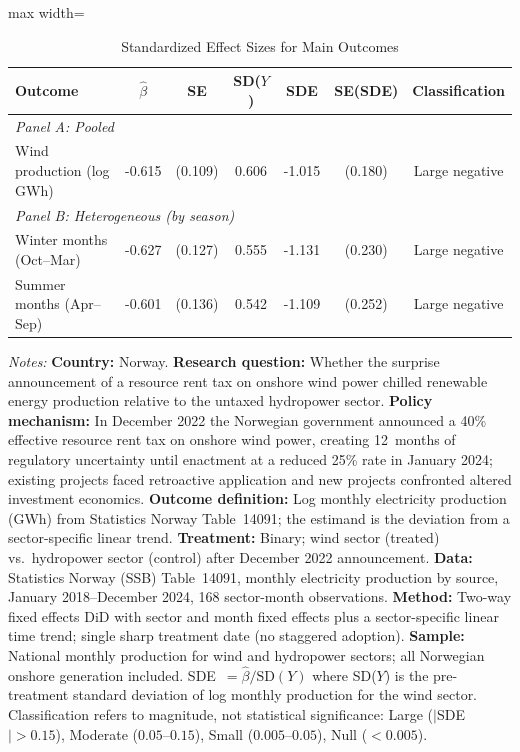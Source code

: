 \begin{table}[H]
\centering
\caption{Standardized Effect Sizes for Main Outcomes}
\label{tab:sde}
\begin{adjustbox}{max width=\textwidth}
\begin{tabular}{lcccccc}
\toprule
Outcome & $\hat{\beta}$ & SE & SD($Y$) & SDE & SE(SDE) & Classification \\
\midrule
\multicolumn{7}{l}{\textit{Panel A: Pooled}} \\
Wind production (log GWh) & -0.615 & (0.109) & 0.606 & -1.015 & (0.180) & Large negative \\
\midrule
\multicolumn{7}{l}{\textit{Panel B: Heterogeneous (by season)}} \\
Winter months (Oct--Mar) & -0.627 & (0.127) & 0.555 & -1.131 & (0.230) & Large negative \\
Summer months (Apr--Sep) & -0.601 & (0.136) & 0.542 & -1.109 & (0.252) & Large negative \\
\bottomrule
\end{tabular}
\end{adjustbox}
\par\vspace{0.3em}
{\footnotesize \textit{Notes:}
\textbf{Country:} Norway.
\textbf{Research question:} Whether the surprise announcement of a resource rent tax on onshore wind power chilled renewable energy production relative to the untaxed hydropower sector.
\textbf{Policy mechanism:} In December 2022 the Norwegian government announced a 40\% effective resource rent tax on onshore wind power, creating 12~months of regulatory uncertainty until enactment at a reduced 25\% rate in January 2024; existing projects faced retroactive application and new projects confronted altered investment economics.
\textbf{Outcome definition:} Log monthly electricity production (GWh) from Statistics Norway Table~14091; the estimand is the deviation from a sector-specific linear trend.
\textbf{Treatment:} Binary; wind sector (treated) vs.\ hydropower sector (control) after December 2022 announcement.
\textbf{Data:} Statistics Norway (SSB) Table~14091, monthly electricity production by source, January 2018--December 2024, 168 sector-month observations.
\textbf{Method:} Two-way fixed effects DiD with sector and month fixed effects plus a sector-specific linear time trend; single sharp treatment date (no staggered adoption).
\textbf{Sample:} National monthly production for wind and hydropower sectors; all Norwegian onshore generation included.
SDE~$= \hat{\beta} / \text{SD}(Y)$ where SD($Y$) is the pre-treatment standard deviation of log monthly production for the wind sector.
Classification refers to magnitude, not statistical significance:
Large ($|$SDE$| > 0.15$), Moderate ($0.05$--$0.15$), Small ($0.005$--$0.05$), Null ($< 0.005$).}
\end{table}
